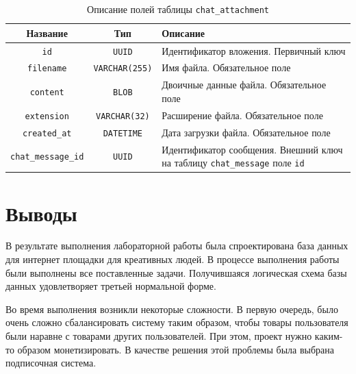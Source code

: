 \documentclass[a4paper,14pt]{extarticle}
\begin{document}
\begin{center}
    \begin{longtable}{|c|c|>{\centering\arraybackslash}m{8.2cm}|}
        \caption{Описание полей таблицы \texttt{chat\_attachment}}
        \label{tab:chat_attachment}
        \\
        \hline
        \textbf{Название}          & \textbf{Тип}          & \textbf{Описание}                                                                        \\
        \hline
        \texttt{id}                & \texttt{UUID}         & Идентификатор вложения. Первичный ключ                                                   \\
        \hline
        \texttt{filename}          & \texttt{VARCHAR(255)} & Имя файла. Обязательное поле                                                             \\
        \hline
        \texttt{content}           & \texttt{BLOB}         & Двоичные данные файла. Обязательное поле                                                 \\
        \hline
        \texttt{extension}         & \texttt{VARCHAR(32)}  & Расширение файла. Обязательное поле                                                      \\
        \hline
        \texttt{created\_at}       & \texttt{DATETIME}     & Дата загрузки файла. Обязательное поле                                                   \\
        \hline
        \texttt{chat\_message\_id} & \texttt{UUID}         & Идентификатор сообщения. Внешний ключ на таблицу \texttt{chat\_message} поле \texttt{id} \\
        \hline
    \end{longtable}
\end{center}

\section{Выводы}

В результате выполнения лабораторной работы была спроектирована база данных для интернет площадки для креативных людей. В процессе выполнения работы были выполнены все поставленные задачи. Получившаяся логическая схема базы данных удовлетворяет третьей нормальной форме.

Во время выполнения возникли некоторые сложности. В первую очередь, было очень сложно сбалансировать систему таким образом, чтобы товары пользователя были наравне с товарами других пользователей. При этом, проект нужно каким-то образом монетизировать. В качестве решения этой проблемы была выбрана подписочная система.
\end{document}
